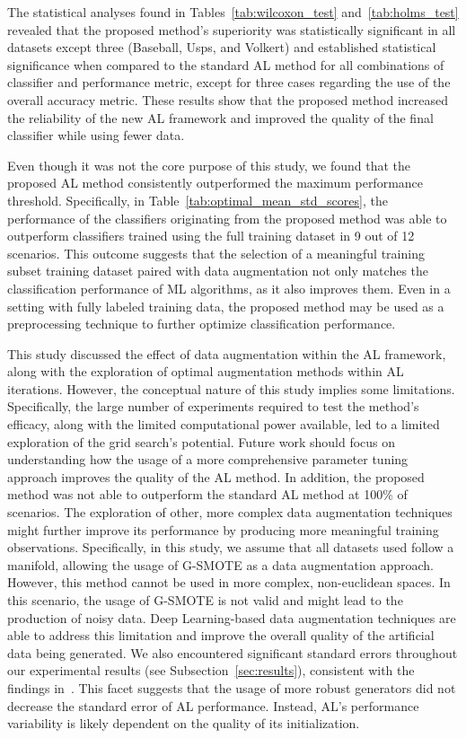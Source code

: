 \documentclass[parskip=full]{scrartcl}
\begin{document}
The statistical analyses found in Tables~\ref{tab:wilcoxon_test}
and~\ref{tab:holms_test} revealed that the proposed method's superiority was
statistically significant in all datasets except three (Baseball, Usps, and
Volkert) and established statistical significance when compared to the
standard AL method for all combinations of classifier and performance metric,
except for three cases regarding the use of the overall accuracy metric. These
results show that the proposed method increased the reliability of the new AL
framework and improved the quality of the final classifier while using fewer
data.

Even though it was not the core purpose of this study, we found that the
proposed AL method consistently outperformed the maximum performance
threshold. Specifically, in Table~\ref{tab:optimal_mean_std_scores}, the
performance of the classifiers originating from the proposed method was able
to outperform classifiers trained using the full training dataset in 9 out of
12 scenarios. This outcome suggests that the selection of a meaningful
training subset training dataset paired with data augmentation not only
matches the classification performance of ML algorithms, as it also improves
them. Even in a setting with fully labeled training data, the proposed method
may be used as a preprocessing technique to further optimize classification
performance.

This study discussed the effect of data augmentation within the AL framework,
along with the exploration of optimal augmentation methods within AL
iterations. However, the conceptual nature of this study implies some
limitations. Specifically, the large number of experiments required to
test the method's efficacy, along with the limited computational power
available, led to a limited exploration of the grid search's potential. Future
work should focus on understanding how the usage of a more comprehensive
parameter tuning approach improves the quality of the AL method. In addition,
the proposed method was not able to outperform the standard AL method at
100\% of scenarios. The exploration of other, more complex data augmentation
techniques might further improve its performance by producing more
meaningful training observations. Specifically, in this study, we assume
that all datasets used follow a manifold, allowing the usage of G-SMOTE as a
data augmentation approach. However, this method cannot be used in more
complex, non-euclidean spaces. In this scenario, the usage of G-SMOTE is not
valid and might lead to the production of noisy data. Deep Learning-based data
augmentation techniques are able to address this limitation and improve the
overall quality of the artificial data being generated. We also
encountered significant standard errors throughout our experimental
results (see Subsection~\ref{sec:results}), consistent with the findings
in~\cite{Fonseca2021, Kottke2017}. This facet suggests that the usage of
more robust generators did not decrease the standard error of AL performance.
Instead, AL's performance variability is likely dependent on the quality of
its initialization.
\end{document}
